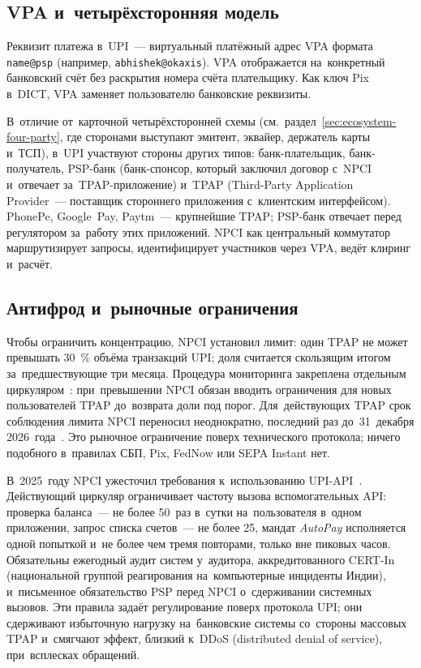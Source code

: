 \subsection*{VPA и~четырёхсторонняя модель}\label{subsec:upi-fourparty}

Реквизит платежа в~UPI~--- виртуальный платёжный адрес VPA формата
\texttt{name@psp} (например, \texttt{abhishek@okaxis}). VPA отображается
на~конкретный банковский счёт без раскрытия номера счёта плательщику.
Как ключ Pix в~DICT, VPA заменяет пользователю банковские реквизиты.

В~отличие от~карточной четырёхсторонней схемы
(см.~раздел~\ref{sec:ecosystem-four-party}, где сторонами выступают эмитент,
эквайер, держатель карты и~ТСП), в~UPI участвуют стороны других типов:
банк-плательщик, банк-получатель, PSP-банк (банк-спонсор, который заключил
договор с~NPCI и~отвечает за~TPAP-приложение) и~TPAP (Third-Party Application
Provider~--- поставщик стороннего приложения с~клиентским интерфейсом). PhonePe,
Google~Pay, Paytm~--- крупнейшие TPAP; PSP-банк отвечает перед регулятором
за~работу этих приложений. NPCI как центральный коммутатор маршрутизирует
запросы, идентифицирует участников через VPA, ведёт клиринг и~расчёт.

\subsection*{Антифрод и~рыночные ограничения}\label{subsec:upi-tpap-cap}

Чтобы ограничить концентрацию, NPCI установил лимит: один TPAP не может
превышать 30~\% объёма транзакций UPI; доля считается скользящим итогом
за~предшествующие три месяца. Процедура мониторинга
закреплена отдельным циркуляром~\cite{npci-upi-tpap-cap}: при~превышении NPCI
обязан вводить ограничения для новых пользователей TPAP до~возврата доли
под порог. Для~действующих TPAP срок соблюдения лимита NPCI переносил
неоднократно, последний раз до~31~декабря
2026~года~\cite{medianama-upi-cap-2026}. Это рыночное ограничение поверх технического протокола; ничего
подобного в~правилах СБП, Pix, FedNow или SEPA Instant нет.

В~2025~году NPCI ужесточил требования к~использованию
UPI-API~\cite{npci-upi-oc-215,npci-upi-circulars}. Действующий циркуляр
ограничивает частоту вызова вспомогательных API: проверка баланса~--- не более
50~раз в~сутки на~пользователя в~одном приложении, запрос списка счетов~--- не
более 25, мандат \textit{AutoPay} исполняется одной попыткой и~не более чем тремя
повторами, только вне пиковых часов. Обязательны ежегодный аудит систем
у~аудитора, аккредитованного CERT-In (национальной группой реагирования
на~компьютерные инциденты Индии), и~письменное обязательство PSP
перед NPCI о~сдерживании системных вызовов.
Эти правила задаёт регулирование поверх протокола UPI; они сдерживают избыточную нагрузку на~банковские системы со~стороны массовых TPAP
и~смягчают эффект, близкий к~DDoS (distributed denial of service), при~всплесках
обращений.

